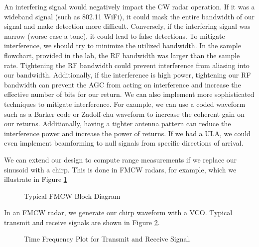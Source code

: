 \documentclass{article}
\begin{document}
An interfering signal would negatively impact the CW radar operation. If it was a wideband signal (such as 802.11 WiFi), it could mask the entire bandwidth of our signal and make detection more difficult. Conversely, if the interfering signal was narrow (worse case a tone), it could lead to false detections. To mitigate interference, we should try to minimize the utilized bandwidth. In the sample flowchart, provided in the lab, the RF bandwidth was larger than the sample rate. Tightening the RF bandwidth could prevent interference from aliasing into our bandwidth. Additionally, if the interference is high power, tightening our RF bandwidth can prevent the AGC from acting on interference and increase the effective number of bits for our return. We can also implement more sophisticated techniques to mitigate interference. For example, we can use a coded waveform such as a Barker code or Zadoff-chu waveform to increase the coherent gain on our returns. Additionally, having a tighter antenna pattern can reduce the interference power and increase the power of returns. If we had a ULA, we could even implement beamforming to null signals from specific directions of arrival.

We can extend our design to compute range measurements if we replace our sinusoid with a chirp. This is done in FMCW radars, for example, which we illustrate in Figure \ref{fig::fmcw_radar}

\begin{figure}[H]
    	\centering
    	\caption{Typical FMCW Block Diagram \cite{9613183}}
    	\label{fig::fmcw_radar}
\end{figure}
	
\noindent In an FMCW radar, we generate our chirp waveform with a VCO.  Typical transmit and receive signals are shown in Figure \ref{fig::fmcw_spectrogram}.

\begin{figure}[H]
    	\centering
    	\caption{Time Frequency Plot for Transmit and Receive Signal.\cite{Long2019AssistingTV}}
    	\label{fig::fmcw_spectrogram}
\end{figure}
\end{document}
